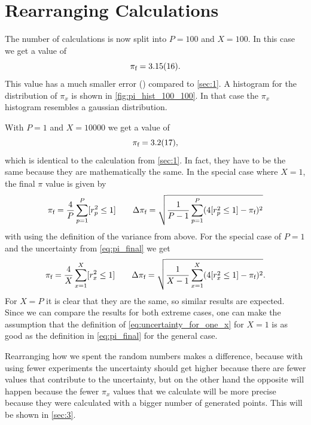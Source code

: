 \section{Rearranging Calculations}\label{sec:2}
The number of calculations is now split into $P = \num{100}$ and
$X = \num{100}$. In this case we get a value of
\begin{equation}
	\final = \num{3.15 \pm 0.16}.
\end{equation}
This value has a much smaller error () compared to \cref{sec:1}. A histogram 
for the distribution of $\pi_x$ is shown in \cref{fig:pi_hist_100_100}.
In that case the $\pi_x$ histogram resembles a gaussian distribution.\par
%
With $P=1$ and $X = \num{10000}$ we get a value of 
\begin{equation}
    \final = \num{3.2\pm 1.7},
\end{equation}
which is identical to the calculation from \cref{sec:1}. In fact, they have to be 
the same because they are mathematically the same. In the special case where 
$X = 1$, the final $\pi$ value is given by 
\[
	\final = \frac{4}{P}\sum_{p=1}^P\iv{r_p^2 \leq 1} \qquad 
	\Delta \final = \sqrt{\frac{1}{P-1}\sum_{p=1}^P(4\iv{r_p^2 \leq 1} - \final)^2}
\]
with using the definition of the variance from above. For the special case 
of $P = 1$ and the uncertainty from \cref{eq:pi_final} we get 
\[
	\final = \frac{4}{X}\sum_{x=1}^X \iv{r_x^2\leq 1} \qquad 
	\Delta \final = \sqrt{\frac{1}{X - 1}\sum_{x=1}^X (4\iv{r_x^2 \leq 1} - \final)^2}.
\]
For $X = P$ it is clear that they are the same, so similar results are expected. 
Since we can compare the results for both extreme cases, one can make the assumption that 
the definition of \cref{eq:uncertainty_for_one_x} for $X=1$ is as good as 
the definition in \ref{eq:pi_final} for the general case.\par 
Rearranging how we spent the random numbers makes a difference, because 
with using fewer experiments the uncertainty should get higher because there are 
fewer values that contribute to the uncertainty, but on the other hand 
the opposite will happen because the fewer $\pi_x$ values that we calculate will 
be more precise because they were calculated with a bigger number of generated points. 
This will be shown in \cref{sec:3}.



